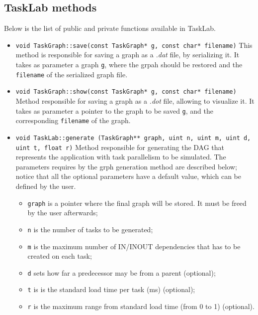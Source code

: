 \subsection{TaskLab methods}
Below is the list of public and private functions available in TaskLab.

\begin{itemize}
\item \texttt{void TaskGraph::save(const TaskGraph* g, const char* filename)} \newline
This method is responsible for saving a graph as a \textit{.dat} file, by serializing it. It takes as parameter a graph \texttt{g}, where the grpah should be restored and the \texttt{filename} of the serialized graph file.

\item \texttt{void TaskGraph::show(const TaskGraph* g, const char* filename)} \newline
Method responsible for saving a graph as a \textit{.dot} file, allowing to visualize it. It takes as parameter a pointer to the graph to be saved  \texttt{g}, and the corresponding \texttt{filename}  of the graph.

\item \texttt{\noindent void TaskLab::generate \newline 
(TaskGraph** graph, uint n, uint m, uint d, uint t, float r)} \newline
Method responsible for generating the DAG that represents the application with task parallelism to be simulated.  The parameters requires by the grph generation method are described below; notice that all the optional parameters have a default value, which can be defined by the user.
\begin{itemize}
\item \texttt{graph} is a pointer where the final graph will be stored. It must be freed by the user afterwards; 
\item \texttt{n} is the number of tasks to be generated; 
\item \texttt{m} is the maximum number of IN/INOUT dependencies that has to be created on each task; 
\item \texttt{d} sets how far a predecessor may be from a parent (optional); 
\item \texttt{t} is is the standard load time per task (ms) (optional); 
\item \texttt{r} is the maximum range from standard load time (from 0 to 1) (optional). 
\end{itemize}


\end{itemize}
